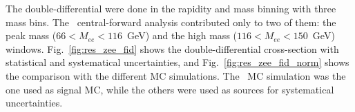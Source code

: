 The double-differential were done in the rapidity and mass binning with three mass bins. The \Zee\ central-forward analysis contributed only to two of them: the peak mass ($66 < M_{ee} < 116$~GeV) and the high mass ($116 < M_{ee} < 150$~GeV) windows. Fig.~\ref{fig:res_zee_fid} shows the double-differential cross-section with statistical and systematical uncertainties, and Fig.~\ref{fig:res_zee_fid_norm} shows the comparison with the different MC simulations. The \Powheg\Pythia\ MC simulation was the one used as signal MC, while the others were used as sources for systematical uncertainties.

\begin{figure}
\end{figure}

